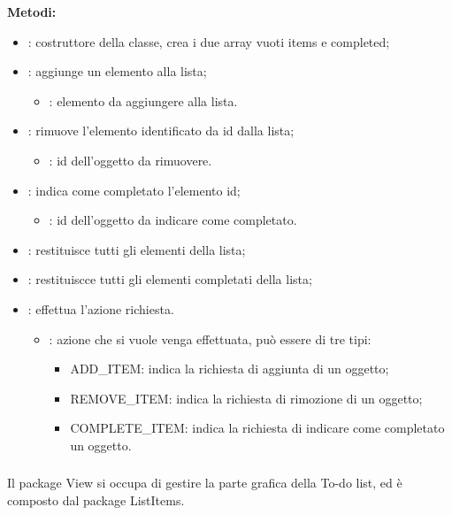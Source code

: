\textbf{Metodi:}
\begin{itemize}
	\item {}: costruttore della classe, crea i due array vuoti items e completed;
	\item {}: aggiunge un elemento alla lista;
		\begin{itemize}
			\item {}: elemento da aggiungere alla lista.
		\end{itemize}
	\item {}: rimuove l'elemento identificato da id dalla lista;
		\begin{itemize}
			\item {}: id dell'oggetto da rimuovere.
		\end{itemize}
	\item {}: indica come completato l'elemento id;
		\begin{itemize}
			\item {}: id dell'oggetto da indicare come completato.
		\end{itemize}
	\item {}: restituisce tutti gli elementi della lista;
	\item {}: restituiscce tutti gli elementi completati della lista;
	\item {}: effettua l'azione richiesta.
		\begin{itemize}
			\item {}: azione che si vuole venga effettuata, può essere di tre tipi:
			\begin{itemize}
				\item ADD\_ITEM: indica la richiesta di aggiunta di un oggetto;
				\item REMOVE\_ITEM: indica la richiesta di rimozione di un oggetto;
				\item COMPLETE\_ITEM: indica la richiesta di indicare come completato un oggetto.
			\end{itemize}
		\end{itemize}
\end{itemize}

\subsubsection[::View]{\class} \label{\class}
Il package View si occupa di gestire la parte grafica della To-do list, ed è composto dal package ListItems.

